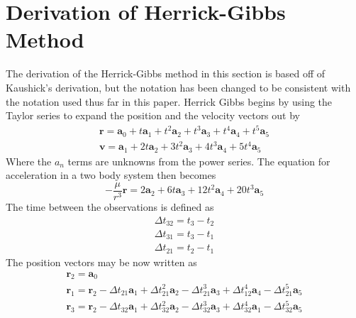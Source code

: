 \documentclass[12pt]{article}
\begin{document}
	\section{Derivation of Herrick-Gibbs Method}
	The derivation of the Herrick-Gibbs method in this section is based off of Kaushick's derivation\cite{Kaushick}, but the notation has been changed to be consistent with the notation used thus far in this paper. Herrick Gibbs begins by using the Taylor series to expand the position and the velocity vectors out by 
	\begin{equation}
	\begin{array} { l } { \mathbf { r } = \mathbf { a } _ { 0 } + t \mathbf { a } _ { 1 } + t ^ { 2 } \mathbf { a } _ { 2 } + t ^ { 3 } \mathbf { a } _ { 3 } + t ^ { 4 } \mathbf { a } _ { 4 } + t ^ { 5 } \mathbf { a } _ { 5 } } \\ { \mathbf { v } = \mathbf { a } _ { 1 } + 2 t \mathbf { a } _ { 2 } + 3 t ^ { 2 } \mathbf { a } _ { 3 } + 4 t ^ { 3 } \mathbf { a } _ { 4 } + 5 t ^ { 4 } \mathbf { a } _ { 5 } } \end{array}
	\end{equation}
	Where the $a_n$ terms are unknowns from the power series. The equation for acceleration in a two body system then becomes
	\begin{equation}
	- \frac { \mu } { r ^ { 3 } } \mathbf { r } = 2 \mathbf { a } _ { 2 } + 6 t \mathbf { a } _ { 3 } + 12 t ^ { 2 } \mathbf { a } _ { 4 } + 20 t ^ { 3 } \mathbf { a } _ { 5 }
	\end{equation}
	The time between the observations is defined as 
	\begin{equation}
	\begin{array} { l } { \Delta t _ { 32 } = t _ { 3 } - t _ { 2 } } \\ { \Delta t _ { 31 } = t _ { 3 } - t _ { 1 } } \\ { \Delta t _ { 21 } = t _ { 2 } - t _ { 1 } } \end{array}
	\end{equation}
	The position vectors may be now written as 
	\begin{equation}
	\begin{array} { l }
	{ \mathbf { r } _ { 2 } = \mathbf { a } _ { 0 } } \\ 
	 { \mathbf { r } _ { 1 } = \mathbf { r } _ { 2 } - \Delta t _ { 21 } \mathbf { a } _ { 1 } + \Delta t _ { 21 } ^ { 2 } \mathbf { a } _ { 2 } - \Delta t _ { 21 } ^ { 3 } \mathbf { a } _ { 3 } + \Delta t _ { 12 } ^ { 4 } \mathbf { a } _ { 4 } - \Delta t _ { 21 } ^ { 5 } \mathbf { a } _ { 5 } } \\ 
	
	{ \mathbf { r } _ { 3 } = \mathbf { r } _ { 2 } - \Delta t _ { 32 } \mathbf { a } _ { 1 } + \Delta t _ { 32 } ^ { 2 } \mathbf { a } _ { 2 } - \Delta t _ { 32 } ^ { 3 } \mathbf { a } _ { 3 } + \Delta t _ { 32 } ^ { 4 } \mathbf { a } _ { 1 } - \Delta t _ { 32 } ^ { 5 } \mathbf { a } _ { 5 } } \\ 	
	\end{array}
	\end{equation}
\end{document}
